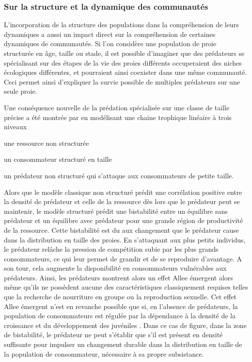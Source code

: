 \subsubsection{Sur la structure et la dynamique des communautés}

L'incorporation de la structure des populations dans la compréhension de leurs 
dynamiques a aussi un impact direct sur la compréhension de certaines dynamiques
de communautés. Si l'on considère une population de proie structurée en âge,
taille ou stade, il est possible d'imaginer que des prédateurs se
spécialisant sur des étapes de la vie des proies différents occuperaient des
niches écologiques différentes, et pourraient ainsi coexister dans une même
communauté. Ceci permet ainsi d'expliquer la survie possible de multiples
prédateurs sur une seule proie. 

Une conséquence nouvelle de la prédation spécialisée sur une classe de taille
précise a été montrée par \textcite{de-roos2002a} en modélisant une chaine
trophique linéaire à trois niveaux \begin{enumerate*}[label=(\roman*),
before=\unskip{ : }, itemjoin={{ ; }}, itemjoin*={{ ; et }}]\item une ressource
non structurée \item un consommateur structuré en taille \item un prédateur non
structuré qui s'attaque aux consommateurs de petite taille.\end{enumerate*}
Alors que le modèle classique non structuré prédit une corrélation positive
entre la densité de prédateur et celle de la ressource dès lors que le prédateur
peut se maintenir, le modèle structuré prédit une bistabilité entre un équilibre
sans prédateur et un équilibre avec prédateur pour une grande région de
productivité de la ressource. Cette bistabilité est du aux changement que le
prédateur cause dans la distribution en taille des proies. En s'attaquant aux
plus petits individus, le prédateur relâche la pression de compétition subie par
les plus grands consommateurs, ce qui leur permet de grandir et de se reproduire
d'avantage.
A son tour, cela augmente la disponibilité en consommateurs vulnérables aux
prédateurs. Ainsi, les prédateurs montrent alors un effet Allee émergent alors
même qu'ils ne possèdent aucune des caractéristiques classiquement requises
telles que la recherche de nourriture en groupe ou la reproduction sexuelle. Cet
effet Allee émergent n'est en revanche possible que si, en l'absence de
prédateurs, la population de consommateurs est régulée par la dépendance à la
densité de la croissance et du développement des juvéniles 
\autocites{de-roos2003a}. Dans ce cas de figure, dans la zone de bistabilité, le
prédateur ne peut s'établir que s'il est présent en densité suffisante pour
impulser un changement durable dans la distribution en taille de la population
de consommateur, nécessaire à sa propre subsistance.

